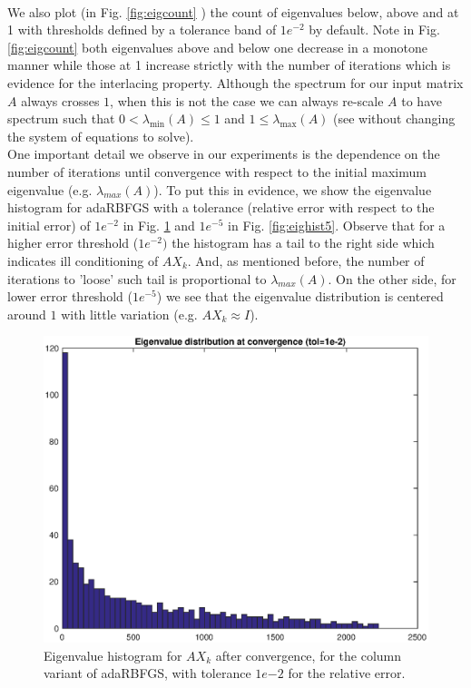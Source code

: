 \documentclass[12pt,conference,compsocconf]{IEEEtran}
\begin{document}
\\We also plot (in Fig. \ref{fig:eigcount} ) the count of eigenvalues below, above and at 1 with thresholds defined by a tolerance band of $1e^{-2}$ by default. Note in Fig. \ref{fig:eigcount} both eigenvalues above and below one decrease in a monotone manner while those at 1 increase strictly with the number of iterations which is evidence for the interlacing property. Although the spectrum for our input matrix $A$ always crosses $1$, when this is not the case we can always re-scale $A$ to have spectrum such that $0 < \lambda_{\text{min}}(A) \leq 1$ and $1 \leq \lambda_{\text{max}}(A)$ (see \cite{Stich1,Gratton} without changing the system of equations to solve).\\
One important detail we observe in our experiments is the dependence on the number of iterations until convergence with respect to the initial maximum eigenvalue (e.g. $\lambda_{max}(A)$). To put this in evidence, we show the eigenvalue histogram for adaRBFGS with a tolerance (relative error with respect to the initial error) of $1e^{-2}$ in Fig. \ref{fig:eighist2} and $1e^{-5}$ in Fig. \ref{fig:eighist5}. Observe that for a higher error threshold ($1e^{-2})$ the histogram has a tail to the right side which indicates ill conditioning of $AX_k$. And, as mentioned before, the number of iterations to 'loose' such tail is proportional to $\lambda_{max}(A)$. On the other side, for lower error threshold ($1e^{-5}$) we see that the eigenvalue distribution is centered around $1$ with little variation (e.g. $AX_k \approx I$).
\begin{figure}
  \centering
  \includegraphics[height=0.7\columnwidth,width=1.0\columnwidth]{eigdisttol2.eps}
  
  \vspace{-2mm}
  \caption{Eigenvalue histogram for $AX_k$ after convergence, for the column variant of adaRBFGS, with tolerance $1e{-2}$ for the relative error. \label{fig:eighist2}}  
  
\end{figure}
\end{document}
